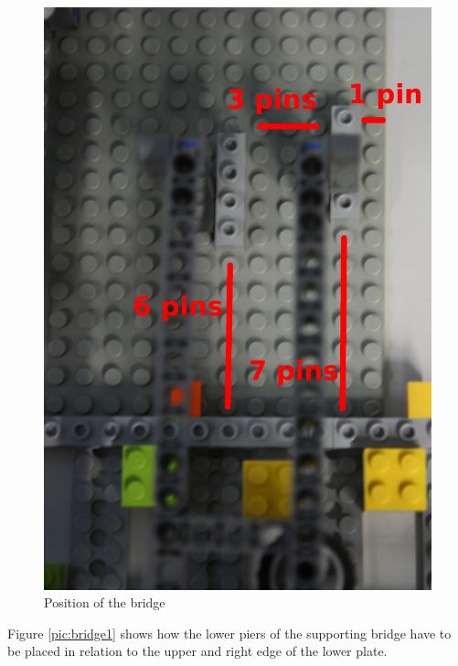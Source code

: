 \documentclass[%
  a4paper,%
  11pt,%
  blue,%
  hyperref	%
  ]{tubsartcl}
\begin{document}
\begin{figure}[!htb]
\begin{center}
\includegraphics[scale=0.35]{graphics_lego/bridge2.jpg}
\end{center}
\caption{Position of the bridge}
\label{pic:bridge2}
\end{figure}

\newpage

Figure \ref{pic:bridge1} shows how the lower piers of the supporting bridge have to be placed in relation to the upper and right edge of the lower plate.
\end{document}
